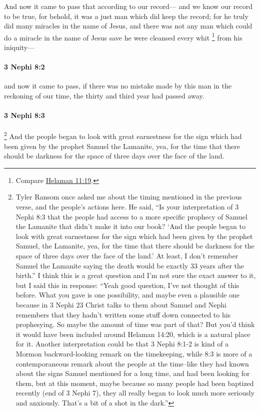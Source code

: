 			And now it came to pass that according to our record---
			and we know our record to be true,
			for behold, it was a just man which did keep the record;
			for he truly did many miracles in the name of Jesus,
			and there was not any man which could do a miracle in the name of Jesus
			save he were cleansed every whit%
				\footnote{%
					Compare \hyperref[HELAMAN-11-19]{Helaman 11:19}.
					}
			from his iniquity---

		\paragraph{3 Nephi 8:2} %
			\label{3NEPHI-8-2}

			and now it came to pass,
			if there was no mistake made by this man in the reckoning of our time,
			the thirty and third year had passed away.

		\paragraph{3 Nephi 8:3} %
			\label{3NEPHI-8-3}

				\footnote{%
					Tyler Ransom once asked me about the timing mentioned in the previous verse, and the people's actions here. He said, ``Is your interpretation of 3 Nephi 8:3 that the people had access to a more specific prophecy of Samuel the Lamanite that didn't make it into our book? `And the people began to look with great earnestness for the sign which had been given by the prophet Samuel, the Lamanite, yea, for the time that there should be darkness for the space of three days over the face of the land.' At least, I don't remember Samuel the Lamanite saying the death would be exactly 33 years after the birth.'' I think this is a great question and I'm not sure the exact answer to it, but I said this in response: ``Yeah good question, I've not thought of this before. What you gave is one possibility, and maybe even a plausible one because in 3 Nephi 23 Christ talks to them about Samuel and Nephi remembers that they hadn't written some stuff down connected to his prophesying. So maybe the amount of time was part of that? But you'd think it would have been included around Helaman 14:20, which is a natural place for it. Another interpretation could be that 3 Nephi 8:1-2 is kind of a Mormon backward-looking remark on the timekeeping, while 8:3 is more of a contemporaneous remark about the people at the time--like they had known about the signs Samuel mentioned for a long time, and had been looking for them, but at this moment, maybe because so many people had been baptized recently (end of 3 Nephi 7), they all really began to look much more seriously and anxiously. That's a bit of a shot in the dark.''
					}%
			And the people began to look with great earnestness for the sign
			which had been given by the prophet Samuel the Lamanite,
			yea, for the time that there should be darkness
			for the space of three days over the face of the land.

